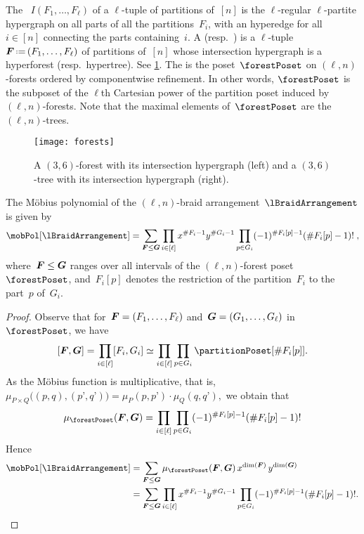 \begin{remark}
\end{remark}

\begin{definition}
The ~$I(F_1, \dots, F_\ell)$ of a $\ell$-tuple of partitions of~$[n]$ is the $\ell$-regular $\ell$-partite hypergraph on all parts of all the partitions~$F_i$, with an hyperedge for all~$i \in [n]$ connecting the parts containing~$i$.
A  (resp.~) is a $\ell$-tuple~$\b{F} \eqdef (F_1, \dots, F_\ell)$ of partitions of~$[n]$ whose intersection hypergraph is a hyperforest (resp.~hypertree).
See \cref{fig:forests}.
The  is the poset~$\forestPoset$ on $(\ell,n)$-forests ordered by componentwise refinement.
In other words, $\forestPoset$ is the subposet of the $\ell$th Cartesian power of the partition poset induced by $(\ell,n)$-forests.
Note that the maximal elements of~$\forestPoset$ are the $(\ell, n)$-trees.
%
\begin{figure}
	\centerline{\texttt{[image: forests]}}
	\caption{A $(3,6)$-forest with its intersection hypergraph (left) and a $(3,6)$-tree with its intersection hypergraph (right).}
	\label{fig:forests}
\end{figure}
\end{definition}

\begin{theorem}
\label{thm:MobiusPolynomial}
The M\"obius polynomial of the $(\ell,n)$-braid arrangement~$\lBraidArrangement$ is given by
\[
\mobPol[\lBraidArrangement] = \sum_{\b{F} \le \b{G}} \prod_{i \in [\ell]} x^{\#F_i-1} y^{\#G_i-1} \prod_{p \in G_i} (-1)^{\#F_i[p]-1} (\# F_i[p]-1)! \; ,
\]
where~$\boldsymbol{F} \le \boldsymbol{G}$ ranges over all intervals of the $(\ell,n)$-forest poset~$\forestPoset$, and~$F_i[p]$ denotes the restriction of the partition~$F_i$ to the part~$p$ of~$G_i$.
\end{theorem}

\begin{proof}
Observe that for~$\boldsymbol{F} = (F_1, \dots, F_\ell)$ and~$\boldsymbol{G} = (G_1, \dots, G_\ell)$ in~$\forestPoset$, we have
\[
[\b{F}, \b{G}] = \prod_{i \in [\ell]} [F_i, G_i] \simeq \prod_{i \in [\ell]} \prod_{p \in G_i} \partitionPoset[{\#F_i[p]}].
\]
As the M\"obius function is multiplicative, that is,
\(
\mu_{P \times Q} \big( (p,q), (p’,q’) \big) = \mu_P(p,p’) \cdot \mu_Q(q,q’),
\)
we obtain that
\[
\mu_{\forestPoset}(\b{F}, \b{G}) = \prod_{i \in [\ell]} \prod_{p \in G_i} (-1)^{\#F_i[p]-1} (\# F_i[p]-1)!
\]
Hence
\begin{align*}
\mobPol[\lBraidArrangement] 
& = \sum_{\b{F} \le \b{G}} \mu_{\forestPoset}(\b{F}, \b{G}) \, x^{\dim(\b{F})} \, y^{\dim(\b{G})} \\
& = \sum_{\b{F} \le \b{G}} \prod_{i \in [\ell]} x^{\#F_i-1} y^{\#G_i-1} \prod_{p \in G_i} (-1)^{\#F_i[p]-1} (\# F_i[p]-1)!.
\qedhere
\end{align*}
\end{proof}

